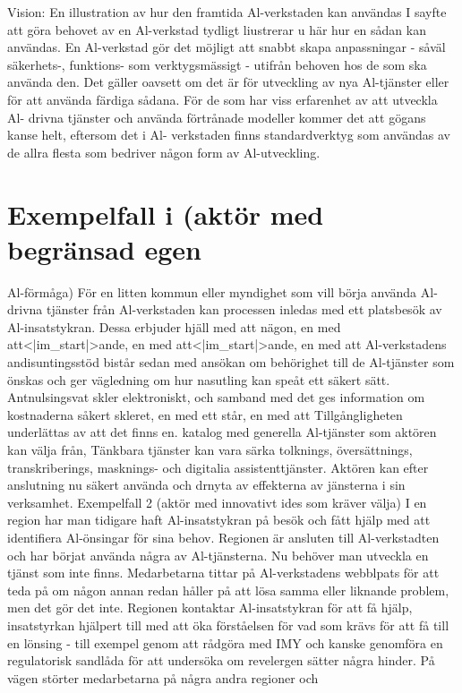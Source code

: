 Vision: En illustration av hur den framtida Al-verkstaden kan användas
I sayfte att göra behovet av en Al-verkstad tydligt
liustrerar u här hur en sådan kan användas.
En Al-verkstad gör det möjligt att snabbt skapa
anpassningar - såväl säkerhets-, funktions- som
verktygsmässigt - utifrån behoven hos de som
ska använda den. Det gäller oavsett om det är för
utveckling av nya Al-tjänster eller för att använda
färdiga sådana.
För de som har viss erfarenhet av att utveckla Al-
drivna tjänster och använda förtrånade modeller
kommer det att gögans kanse helt, eftersom det i Al-
verkstaden finns standardverktyg som användas av de
allra flesta som bedriver någon form av Al-utveckling.
\section*{Exempelfall i (aktör med begränsad egen}
Al-förmåga)
För en litten kommun eller myndighet som vill börja
använda Al-drivna tjänster från Al-verkstaden
kan processen inledas med ett platsbesök av
Al-insatstykran. Dessa erbjuder hjäll med att
nägon, en med att<|im_start|>ande, en med att<|im_start|>ande, en med att
Al-verkstadens andisuntingsstöd bistår sedan med
ansökan om behörighet till de Al-tjänster som önskas
och ger vägledning om hur nasutling kan speåt ett
säkert sätt. Antnulsingsvat skler elektroniskt, och
samband med det ges information om kostnaderna
såkert skleret, en med ett står, en med att
Tillgångligheten underlättas av att det finns en.
katalog med generella Al-tjänster som aktören kan
välja från, Tänkbara tjänster kan vara särka tolknings,
översättnings, transkriberings, masknings- och
digitalia assistenttjänster. Aktören kan efter anslutning
nu säkert använda och drnyta av effekterna av
jänsterna i sin verksamhet.
Exempelfall 2 (aktör med innovativt ides som kräver
välja)
I en region har man tidigare haft Al-insatstykran på
besök och fått hjälp med att identifiera Al-önsingar
för sina behov. Regionen är ansluten till Al-verkstadten
och har börjat använda några av Al-tjänsterna. Nu
behöver man utveckla en tjänst som inte finns.
Medarbetarna tittar på Al-verkstadens webblpats för att teda på om någon annan redan håller på att lösa
samma eller liknande problem, men det gör det inte.
Regionen kontaktar Al-insatstykran för att få hjälp,
insatstyrkan hjälpert till med att öka förståelsen för
vad som krävs för att få till en lönsing - till exempel
genom att rådgöra med IMY och kanske genomföra
en regulatorisk sandlåda för att undersöka om
revelergen sätter några hinder. På vägen störter
medarbetarna på några andra regioner och

